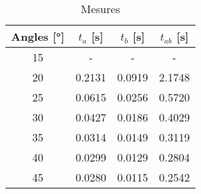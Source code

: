 \begin{table}
\centering
\begin{tabular}{|c|c|c|c|}
\hline
Angles [°] & $t_a$ [s] & $t_b$ [s] & $t_{ab}$ [s] \\
\hline
15 & - & - & - \\
\hline
20 & 0.2131 & 0.0919 & 2.1748 \\
\hline
25 & 0.0615 & 0.0256 & 0.5720 \\
\hline
30 & 0.0427 & 0.0186 & 0.4029 \\
\hline
35 & 0.0314 & 0.0149 & 0.3119 \\
\hline
40 & 0.0299 & 0.0129 & 0.2804 \\
\hline
45 & 0.0280 & 0.0115 & 0.2542 \\
\hline
\end{tabular}
\caption{Mesures}
\label{table:mesurebp}
\end{table}
